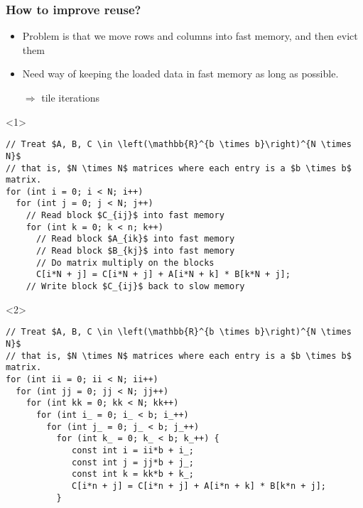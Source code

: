 \documentclass[dvipsnames,presentation,aspectratio=169,14pt]{beamer}
\begin{document}
\begin{frame}[fragile]
  \frametitle{How to improve reuse?}
  \begin{itemize}
  \item Problem is that we move rows and columns into fast memory, and
    then evict them
  \item Need way of keeping the loaded data in fast memory as long as
    possible.
  \item[$\Rightarrow$] tile iterations
  \end{itemize}
  \begin{onlyenv}<1>
\begin{verbatim}
// Treat $A, B, C \in \left(\mathbb{R}^{b \times b}\right)^{N \times N}$
// that is, $N \times N$ matrices where each entry is a $b \times b$ matrix.
for (int i = 0; i < N; i++)
  for (int j = 0; j < N; j++)
    // Read block $C_{ij}$ into fast memory
    for (int k = 0; k < n; k++)
      // Read block $A_{ik}$ into fast memory
      // Read block $B_{kj}$ into fast memory
      // Do matrix multiply on the blocks
      C[i*N + j] = C[i*N + j] + A[i*N + k] * B[k*N + j];
    // Write block $C_{ij}$ back to slow memory
\end{verbatim}
  \end{onlyenv}
  \begin{onlyenv}<2>
\begin{verbatim}
// Treat $A, B, C \in \left(\mathbb{R}^{b \times b}\right)^{N \times N}$
// that is, $N \times N$ matrices where each entry is a $b \times b$ matrix.
for (int ii = 0; ii < N; ii++)
  for (int jj = 0; jj < N; jj++)
    for (int kk = 0; kk < N; kk++)
      for (int i_ = 0; i_ < b; i_++)
        for (int j_ = 0; j_ < b; j_++)
          for (int k_ = 0; k_ < b; k_++) {
             const int i = ii*b + i_;
             const int j = jj*b + j_;
             const int k = kk*b + k_;
             C[i*n + j] = C[i*n + j] + A[i*n + k] * B[k*n + j];
          }
\end{verbatim}
  \end{onlyenv}
\end{frame}
\end{document}
